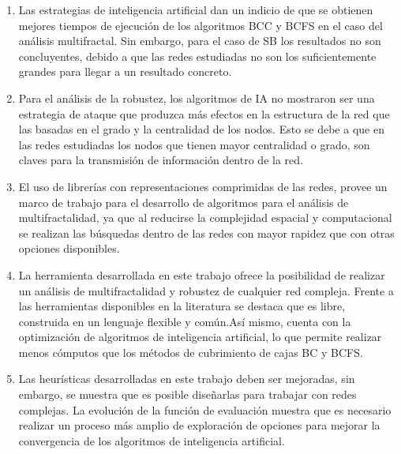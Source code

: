 \begin{enumerate}
    \item Las estrategias de inteligencia artificial dan un indicio de que se obtienen mejores tiempos de ejecución de los algoritmos BCC y BCFS en el caso del análisis multifractal. Sin embargo, para el caso de SB los resultados no son concluyentes, debido a que las redes estudiadas no son los suficientemente grandes para llegar a un resultado concreto.
    \item Para el análisis de la robustez, los algoritmos de IA no mostraron ser una estrategia de ataque que produzca más efectos en la estructura de la red que las basadas en el grado y la centralidad de los nodos. Esto se debe a que en las redes estudiadas los nodos que tienen mayor centralidad o grado, son claves para la transmisión de información dentro de la red.
    \item El uso de librerías con representaciones comprimidas de las redes, provee un marco de trabajo para el desarrollo de algoritmos para el análisis de multifractalidad, ya que al reducirse la complejidad espacial y computacional se realizan las búsquedas dentro de las redes con mayor rapidez que con otras opciones disponibles.
    \item La herramienta desarrollada en este trabajo ofrece la posibilidad de realizar un análisis de multifractalidad y robustez de cualquier red compleja. Frente a las herramientas disponibles en la literatura se destaca que es libre, construida en un lenguaje flexible y común.Así mismo, cuenta con la optimización de algoritmos de inteligencia artificial, lo que permite realizar menos cómputos que los métodos de cubrimiento de cajas BC y BCFS.
    \item Las heurísticas desarrolladas en este trabajo deben ser mejoradas, sin embargo, se muestra que es posible diseñarlas para trabajar con redes complejas. La evolución de la función de evaluación muestra que es necesario realizar un proceso más amplio de exploración de opciones para mejorar la convergencia de los algoritmos de inteligencia artificial.
\end{enumerate}